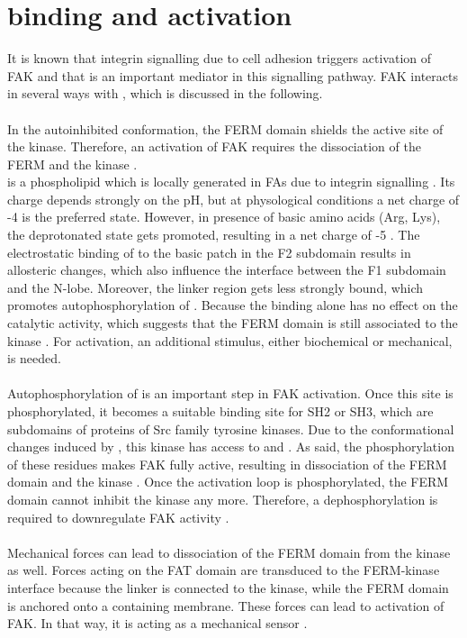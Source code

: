 \section{\pip{} binding and activation}
It is known that integrin signalling due to cell adhesion triggers activation of FAK and that \pip{} is an important mediator in this signalling pathway. FAK interacts in several ways with \pip{}, which is discussed in the following.\\
\\
In the autoinhibited conformation, the FERM domain shields the active site of the kinase. Therefore, an activation of FAK requires the dissociation of the FERM and the kinase \autocite{structFAK}.\\
\pip{} is a phospholipid which is locally generated in FAs due to integrin signalling \autocite{pip2LocalGeneration}. Its charge depends strongly on the pH, but at physological conditions a net charge of -4 is the preferred state. However, in presence of basic amino acids (Arg, Lys), the deprotonated state gets promoted, resulting in a net charge of -5 \autocite{pip2_minus5}. The electrostatic binding of \pip{} to the basic patch in the F2 subdomain results in allosteric changes, which also influence the interface between the F1 subdomain and the N-lobe. Moreover, the linker region gets less strongly bound, which promotes autophosphorylation of . Because the \pip{} binding alone has no effect on the catalytic activity, which suggests that the FERM domain is still associated to the kinase \autocites{pap001}{pap003}. For activation, an additional stimulus, either biochemical or mechanical, is needed.\\
\\
Autophosphorylation of  is an important step in FAK activation. Once this site is phosphorylated, it becomes a suitable binding site for SH2 or SH3, which are subdomains of proteins of Src family tyrosine kinases. Due to the conformational changes induced by \pip{}, this kinase has access to  and . As said, the phosphorylation of these residues makes FAK fully active, resulting in dissociation of the FERM domain and the kinase \autocite{pap001}. Once the activation loop is phosphorylated, the FERM domain cannot inhibit the kinase any more. Therefore, a dephosphorylation is required to downregulate FAK activity \autocite{structFAK}.\\
\\
Mechanical forces can lead to dissociation of the FERM domain from the kinase as well. Forces acting on the FAT domain are transduced to the FERM-kinase interface because the linker is connected to the kinase, while the FERM domain is anchored onto a \pip{} containing membrane. These forces can lead to activation of FAK. In that way, it is acting as a mechanical sensor \autocite{pap004}.\\
